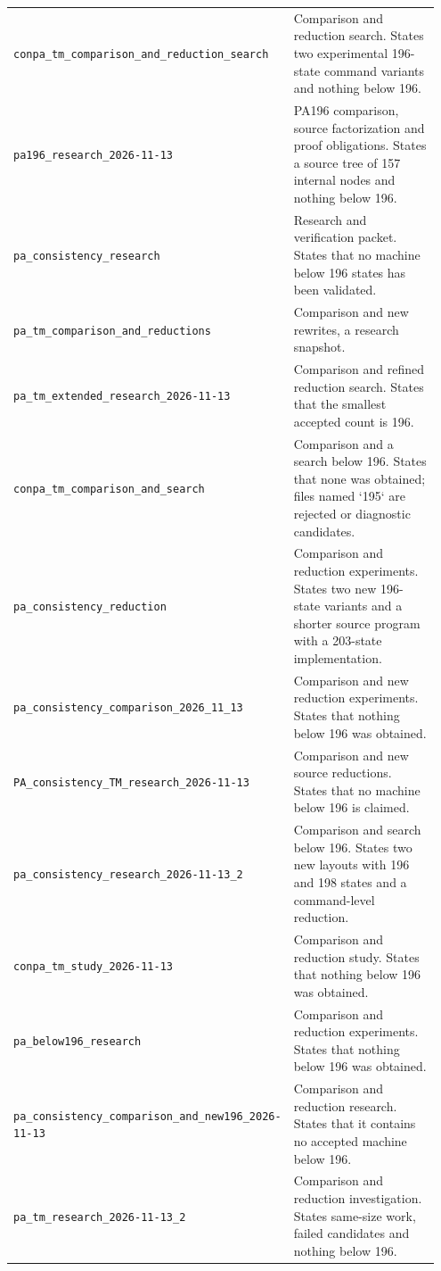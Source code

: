 \begin{longtable}{@{}p{0.36\linewidth}p{0.59\linewidth}@{}}
\nolinkurl{conpa_tm_comparison_and_reduction_search} & Comparison and reduction search. States two experimental 196-state command variants and nothing below 196.\\[4pt]
\nolinkurl{pa196_research_2026-11-13} & PA196 comparison, source factorization and proof obligations. States a source tree of 157 internal nodes and nothing below 196.\\[4pt]
\nolinkurl{pa_consistency_research} & Research and verification packet. States that no machine below 196 states has been validated.\\[4pt]
\nolinkurl{pa_tm_comparison_and_reductions} & Comparison and new rewrites, a research snapshot.\\[4pt]
\nolinkurl{pa_tm_extended_research_2026-11-13} & Comparison and refined reduction search. States that the smallest accepted count is 196.\\[4pt]
\nolinkurl{conpa_tm_comparison_and_search} & Comparison and a search below 196. States that none was obtained; files named `195` are rejected or diagnostic candidates.\\[4pt]
\nolinkurl{pa_consistency_reduction} & Comparison and reduction experiments. States two new 196-state variants and a shorter source program with a 203-state implementation.\\[4pt]
\nolinkurl{pa_consistency_comparison_2026_11_13} & Comparison and new reduction experiments. States that nothing below 196 was obtained.\\[4pt]
\nolinkurl{PA_consistency_TM_research_2026-11-13} & Comparison and new source reductions. States that no machine below 196 is claimed.\\[4pt]
\nolinkurl{pa_consistency_research_2026-11-13_2} & Comparison and search below 196. States two new layouts with 196 and 198 states and a command-level reduction.\\[4pt]
\nolinkurl{conpa_tm_study_2026-11-13} & Comparison and reduction study. States that nothing below 196 was obtained.\\[4pt]
\nolinkurl{pa_below196_research} & Comparison and reduction experiments. States that nothing below 196 was obtained.\\[4pt]
\nolinkurl{pa_consistency_comparison_and_new196_2026-11-13} & Comparison and reduction research. States that it contains no accepted machine below 196.\\[4pt]
\nolinkurl{pa_tm_research_2026-11-13_2} & Comparison and reduction investigation. States same-size work, failed candidates and nothing below 196.\\[4pt]

\end{longtable}
